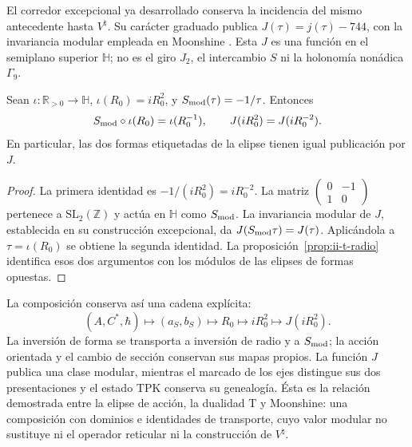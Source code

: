 El corredor excepcional ya desarrollado conserva la incidencia del mismo
antecedente hasta \(V^\natural\). Su carácter graduado publica
\(J(\tau)=j(\tau)-744\), con la invariancia modular empleada en
Moonshine \cite{flm,borcherds}. Esta \(J\) es una función en el
semiplano superior \(\mathbb H\); no es el giro \(J_2\), el
intercambio \(S\) ni la holonomía nonádica \(\Gamma_9\).

\begin{proposition}
\label{prop:ii-t-modular}
Sean \(\iota:\mathbb R_{>0}\to\mathbb H\),
\(\iota(R_0)=iR_0^2\), y
\(S_{\rm mod}(\tau)=-1/\tau\). Entonces
\begin{equation}
 S_{\rm mod}\circ\iota(R_0)=\iota(R_0^{-1}),\qquad
 J(iR_0^2)=J(iR_0^{-2}).
 \label{eq:ii-t-modular}
\end{equation}
En particular, las dos formas etiquetadas de la elipse tienen igual
publicación por \(J\).
\end{proposition}

\begin{proof}
La primera identidad es
\(-1/(iR_0^2)=iR_0^{-2}\). La matriz
\(\left(\begin{smallmatrix}0&-1\\1&0\end{smallmatrix}\right)\)
pertenece a \(\mathrm{SL}_2(\mathbb Z)\) y actúa en
\(\mathbb H\) como \(S_{\rm mod}\). La invariancia modular de
\(J\), establecida en su construcción excepcional, da
\(J(S_{\rm mod}\tau)=J(\tau)\). Aplicándola a
\(\tau=\iota(R_0)\) se obtiene la segunda identidad.
La proposición~\ref{prop:ii-t-radio} identifica esos dos argumentos
con los módulos de las elipses de formas opuestas.
\end{proof}

La composición conserva así una cadena explícita:
\[
 (A,C^*,\hbar)\longmapsto(a_S,b_S)
 \longmapsto R_0\longmapsto iR_0^2\longmapsto J(iR_0^2).
\]
La inversión de forma se transporta a inversión de radio y a
\(S_{\rm mod}\); la acción orientada y el cambio de sección conservan
sus mapas propios. La función \(J\) publica una clase modular, mientras
el marcado de los ejes distingue sus dos presentaciones y el estado TPK
conserva su genealogía. Ésta es la relación demostrada entre la elipse de
acción, la dualidad T y Moonshine: una composición con dominios e
identidades de transporte, cuyo valor modular no sustituye ni el operador
reticular ni la construcción de \(V^\natural\).
